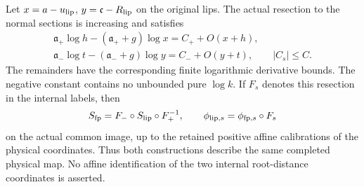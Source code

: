 \begin{lemma}
Let \(x=a-u_{\rm lip}\), \(y=\mathfrak c-R_{\rm lip}\) on the
original lips. The actual resection to the normal sections is
increasing and satisfies
\begin{equation}
 \begin{gathered}
 \mathfrak a_+\log h-(\mathfrak a_++g)\log x=C_++O(x+h),\\
 \mathfrak a_-\log t-(\mathfrak a_-+g)\log y=C_-+O(y+t),
 \qquad |C_s|\le C .
 \end{gathered}
 \label{deg:joint-root-exact-lip-resection}
\end{equation}
The remainders have the corresponding finite logarithmic derivative
bounds. The negative constant contains no unbounded pure \(\log k\).
If \(F_s\) denotes this resection in the internal labels, then
\begin{equation}
 S_{\rm fp}=F_-\circ S_{\rm lip}\circ F_+^{-1},\qquad
 \phi_{{\rm lip},s}=\phi_{{\rm fp},s}\circ F_s
 \label{deg:joint-root-physical-composition}
\end{equation}
on the actual common image, up to the retained positive affine
calibrations of the physical coordinates. Thus both constructions
describe the same completed physical map. No affine identification
of the two internal root-distance coordinates is asserted.
\end{lemma}

